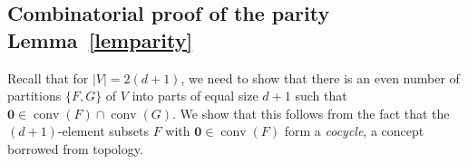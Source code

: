 \documentclass[english,a4paper,nolineno]{lipics-v2019}
\newcommand{\nula}{\mathbf{0}}
\newcommand{\conv}{\mathop{\mathrm{conv}}}
\begin{document}


\subsection{Combinatorial proof of the parity Lemma~\ref{lemparity}}
Recall that for $|V|=2(d+1)$, we need to show that there is an even number of partitions $\{F,G\}$ of $V$ into parts of equal size $d+1$ such that $\nula\in\conv(F)\cap\conv(G)$.
We show that this follows from the fact that the $(d+1)$-element subsets $F$ with $\nula\in\conv(F)$ form a \emph{cocycle}, a concept borrowed from topology. %
\end{document}
